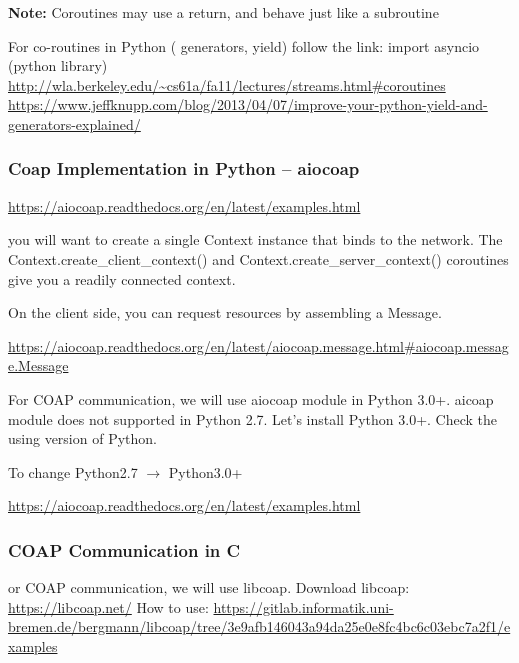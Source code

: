 \documentclass[letterpaper,10pt,english]{sphinxmanual}
\begin{document}
\textbf{Note:} Coroutines may use a return, and behave just like a subroutine

For co-routines in Python ( generators, yield) follow the link: import asyncio (python library)
\href{http://wla.berkeley.edu/~cs61a/fa11/lectures/streams.html\#coroutines}{http://wla.berkeley.edu/\textasciitilde{}cs61a/fa11/lectures/streams.html\#coroutines}
\href{https://www.jeffknupp.com/blog/2013/04/07/improve-your-python-yield-and-generators-explained/}{https://www.jeffknupp.com/blog/2013/04/07/improve-your-python-yield-and-generators-explained/}


\subsubsection{Coap Implementation in Python – aiocoap}
\label{week-10:coap-implementation-in-python-aiocoap}
\href{https://aiocoap.readthedocs.org/en/latest/examples.html}{https://aiocoap.readthedocs.org/en/latest/examples.html}

you will want to create a single Context instance that binds to the network.  The Context.create\_client\_context() and Context.create\_server\_context() coroutines give you a readily connected context.

On the client side, you can request resources by assembling a Message.

\href{https://aiocoap.readthedocs.org/en/latest/aiocoap.message.html\#aiocoap.message.Message}{https://aiocoap.readthedocs.org/en/latest/aiocoap.message.html\#aiocoap.message.Message}

For COAP communication, we will use aiocoap module in Python 3.0+. aicoap module does not supported in Python 2.7. Let's install Python 3.0+.
Check the using version of Python.


To change Python2.7 \(\rightarrow\) Python3.0+


\href{https://aiocoap.readthedocs.org/en/latest/examples.html}{https://aiocoap.readthedocs.org/en/latest/examples.html}


\subsubsection{COAP Communication in C}
\label{week-10:coap-communication-in-c}
or COAP communication, we will use libcoap.
Download libcoap: \href{https://libcoap.net/}{https://libcoap.net/}
How to use: \href{https://gitlab.informatik.uni-bremen.de/bergmann/libcoap/tree/3e9afb146043a94da25e0e8fc4bc6c03ebc7a2f1/examples}{https://gitlab.informatik.uni-bremen.de/bergmann/libcoap/tree/3e9afb146043a94da25e0e8fc4bc6c03ebc7a2f1/examples}
\label{appendix:appendix}
\end{document}
